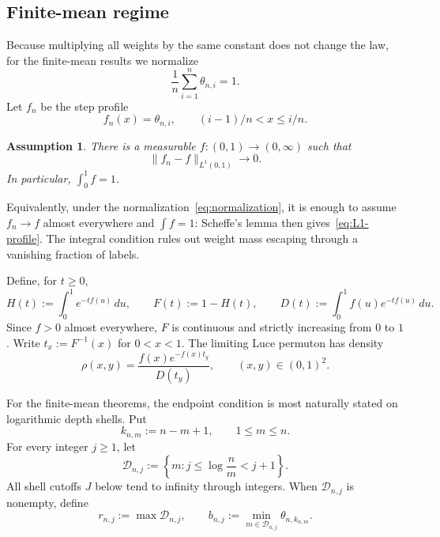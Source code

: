 \documentclass[11pt]{article}
\theoremstyle{remark}
\theoremstyle{plain}
\newtheorem{assumption}[theorem]{Assumption}
\begin{document}
\subsection{Finite-mean regime}

Because multiplying all weights by the same constant does not change the
law, for the finite-mean results we normalize
\begin{equation}\label{eq:normalization}
 \frac1n\sum_{i=1}^n\theta_{n,i}=1.
\end{equation}
Let $f_n$ be the step profile
\begin{equation}\label{eq:step-profile}
 f_n(x)=\theta_{n,i},\qquad (i-1)/n<x\le i/n.
\end{equation}

\begin{assumption}\label{ass:profile}
There is a measurable $f:(0,1)\to(0,\infty)$ such that
\begin{equation}\label{eq:L1-profile}
 \lVert f_n-f\rVert_{L^1(0,1)}\longrightarrow0.
\end{equation}
In particular, $\int_0^1f=1$.
\end{assumption}

Equivalently, under the normalization~\eqref{eq:normalization}, it is enough
to assume $f_n\to f$ almost everywhere and $\int f=1$: Scheffe's lemma then
gives~\eqref{eq:L1-profile}.  The integral condition rules out weight mass
escaping through a vanishing fraction of labels.

Define, for $t\ge0$,
\begin{equation}\label{eq:HFD}
 H(t):=\int_0^1e^{-t f(u)}\,du,\qquad
 F(t):=1-H(t),\qquad
 D(t):=\int_0^1 f(u)e^{-t f(u)}\,du.
\end{equation}
Since $f>0$ almost everywhere, $F$ is continuous and strictly increasing from
$0$ to $1$.  Write $t_x:=F^{-1}(x)$ for $0<x<1$.  The limiting Luce permuton
has density
\begin{equation}\label{eq:rho}
 \rho(x,y)=
 \frac{f(x)e^{-f(x)t_y}}{D(t_y)},
 \qquad (x,y)\in(0,1)^2.
\end{equation}

For the finite-mean theorems, the endpoint condition is most naturally
stated on logarithmic depth shells.  Put
\begin{equation}\label{eq:terminal-depth-notation}
 k_{n,m}:=n-m+1,
 \qquad 1\le m\le n.
\end{equation}
For every integer $j\ge1$, let
\begin{equation}\label{eq:terminal-shells}
 \mathcal D_{n,j}:=
 \left\{m:j\le\log\frac{n}{m}<j+1\right\}.
\end{equation}
All shell cutoffs $J$ below tend to infinity through integers.
When $\mathcal D_{n,j}$ is nonempty, define
\begin{equation}\label{eq:shell-floor}
 r_{n,j}:=\max\mathcal D_{n,j},
 \qquad
 b_{n,j}:=\min_{m\in\mathcal D_{n,j}}\theta_{n,k_{n,m}}.
\end{equation}
\end{document}
